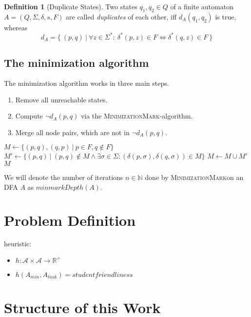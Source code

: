 \documentclass[a4paper, oneside, 11pt]{report}
\theoremstyle{definition}
\newtheorem{definition}{Definition}
\theoremstyle{remark}
\newcommand{\MinMark}{\textsc{MinimizationMark}}
\begin{document}
\begin{definition}[Duplicate States]
	Two states $q_1, q_2 \in Q$ of a finite automaton $A = (Q, \Sigma, \delta, s, F)$ are called \emph{duplicates} of each other, iff $d_A(q_1, q_2)$ is true, whereas
	\[
		d_A = \{\ (p, q)\ |\ \forall z \in \Sigma^* \colon\ \delta^*(p, z) \in F \Leftrightarrow \delta^*(q, z) \in F\ \}
	\]
\end{definition}

\subsection{The minimization algorithm}

The minimization algorithm works in three main steps.
\begin{enumerate}
	\item Remove all unreachable states.
	\item Compute $\neg d_A(p, q)$ via the \MinMark-algorithm.
	\item Merge all node pairs, which are not in $\neg d_A(p, q)$.
\end{enumerate}

\begin{algorithmic}[1]
	\State $M \gets \{ (p,q), (q,p)\ |\ p \in F, q \notin F \}$
	\Do
		\State $M' \gets \{ (p,q)\ |\ (p,q) \notin M \land \exists \sigma \in \Sigma \colon (\delta(p,\sigma), \delta(q,\sigma)) \in M \}$
		\State $M \gets M \cup M'$
	\State \Return $M$
	\EndFunction
\end{algorithmic}
We will denote the number of iterations $n \in \mathbb{N}$ done by \MinMark on an DFA $A$ as $minmarkDepth(A)$.

\section{Problem Definition}

heuristic:
\begin{itemize}
	\item $h \colon \mathcal{A} \times \mathcal{A} \to \mathbb{R^+}$
	\item $h(A_{min}, A_{task}) = studentfriendliness$
\end{itemize}

\section{Structure of this Work}
\end{document}
